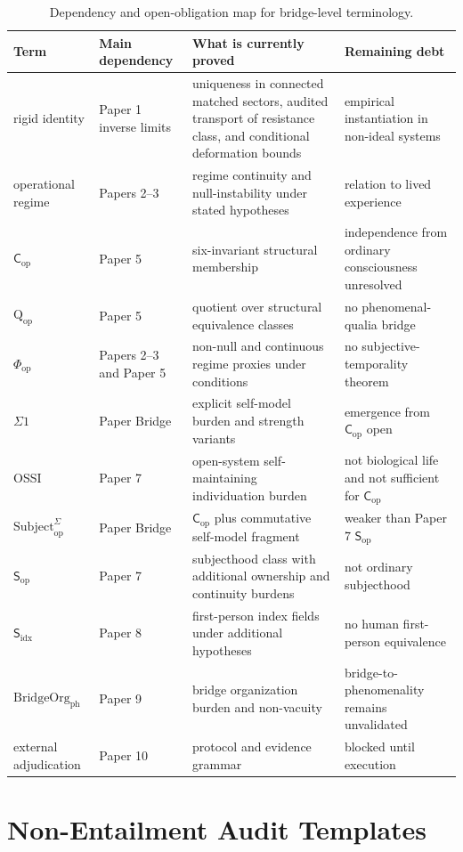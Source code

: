 \documentclass[11pt,a4paper]{article}
\theoremstyle{definition}
\newcommand{\Cop}{\mathsf{C}_{\mathrm{op}}}
\newcommand{\Subop}{\mathsf{S}_{\mathrm{op}}}
\newcommand{\Subfp}{\mathsf{S}_{\mathrm{idx}}}
\newcommand{\Subbridge}{\mathrm{Subject}^{\Sigma}_{\mathrm{op}}}
\newcommand{\Qop}{\mathrm{Q}_{\mathrm{op}}}
\newcommand{\Phiop}{\Phi_{\mathrm{op}}}
\begin{document}
\begin{table}[ht]
\centering
\caption{Dependency and open-obligation map for bridge-level terminology.}
\label{tab:debt-ledger}
\small
\begin{tabularx}{\textwidth}{>{\raggedright\arraybackslash}p{2.5cm} Y Y Y}
\toprule
Term & Main dependency & What is currently proved & Remaining debt \\
\midrule
rigid identity & Paper 1 inverse limits & uniqueness in connected matched sectors, audited transport of resistance class, and conditional deformation bounds & empirical instantiation in non-ideal systems \\
operational regime & Papers 2--3 & regime continuity and null-instability under stated hypotheses & relation to lived experience \\
$\Cop$ & Paper 5 & six-invariant structural membership & independence from ordinary consciousness unresolved \\
$\Qop$ & Paper 5 & quotient over structural equivalence classes & no phenomenal-qualia bridge \\
$\Phiop$ & Papers 2--3 and Paper 5 & non-null and continuous regime proxies under conditions & no subjective-temporality theorem \\
$\Sigma1$ & Paper Bridge & explicit self-model burden and strength variants & emergence from $\Cop$ open \\
OSSI & Paper 7 & open-system self-maintaining individuation burden & not biological life and not sufficient for $\Cop$ \\
$\Subbridge$ & Paper Bridge & $\Cop$ plus commutative self-model fragment & weaker than Paper 7 $\Subop$ \\
$\Subop$ & Paper 7 & subjecthood class with additional ownership and continuity burdens & not ordinary subjecthood \\
$\Subfp$ & Paper 8 & first-person index fields under additional hypotheses & no human first-person equivalence \\
$\mathrm{BridgeOrg}_{\mathrm{ph}}$ & Paper 9 & bridge organization burden and non-vacuity & bridge-to-phenomenality remains unvalidated \\
external adjudication & Paper 10 & protocol and evidence grammar & blocked until execution \\
\bottomrule
\end{tabularx}
\end{table}

\section{Non-Entailment Audit Templates}
\end{document}
